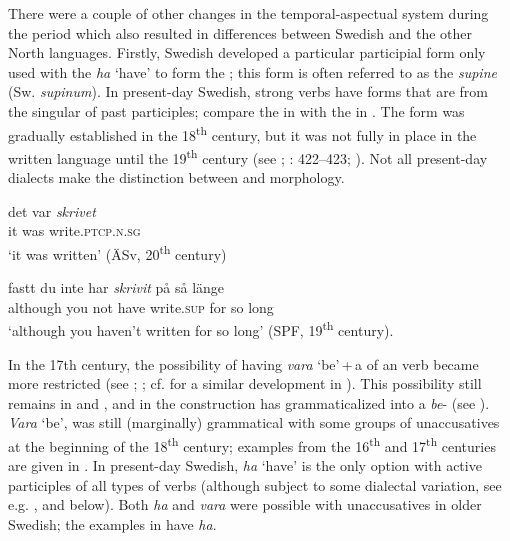 \documentclass[output=paper]{langscibook}
\begin{document}
There were a couple of other changes in the temporal-aspectual system during the  period which also resulted in differences between Swedish and the other North  languages. Firstly, Swedish developed a particular participial form only used with the  \textit{ha} ‘have’ to form the  ; this form is often referred to as the \textit{supine} (Sw. \textit{supinum}). In present-day Swedish, strong verbs have  forms that are  from the  singular of past participles; compare the  in  with the  in . The  form was gradually established in the 18\textsuperscript{th} century, but it was not fully in place in the written language until the 19\textsuperscript{th} century (see \citealt{Platzack1981}; \citealt{Larsson2009}: 422–423; \citealt{Backstrom2019}). Not all present-day dialects make the distinction between  and  morphology.


\ea\label{ex:intro:7}
\ea\label{ex:intro:7a}
\gll  det    var \textit{skrivet} \\
it   was write.\textsc{ptcp.n.sg}\\
\glt    ‘it was written’ (ÄSv, 20\textsuperscript{th} century)


\ex\label{ex:intro:7b}
\gll  fastt       du   inte   har \textit{skrivit}  på   så   länge\\
      although   you   not   have   write.\textsc{sup}   for   so long\\
\glt    ‘although you haven’t written for so long’ (SPF, 19\textsuperscript{th} century).
\z
\z


In the 17th century, the possibility of having \textit{vara} ‘be’\,+\,a  of an  verb became more restricted (see \citealt{Johannisson1945}; \citealt{Larsson2009,Larsson2015}; cf. \citealt{McFaddenAlexiadou2005} for a similar development in ). This possibility still remains in  and , and in  the construction has grammaticalized into a \textit{be}{}- (see \citealt{Larsson2021Emergence}). \textit{Vara} ‘be’, was still (marginally) grammatical with some groups of unaccusatives at the beginning of the 18\textsuperscript{th} century; examples from the 16\textsuperscript{th} and 17\textsuperscript{th} centuries are given in . In present-day Swedish, \textit{ha} ‘have’ is the only option with active participles of all types of verbs (although subject to some dialectal variation, see e.g. \citealt{Larsson2014HAVE}, and  below). Both \textit{ha} and \textit{vara} were possible with unaccusatives in older Swedish; the examples in  have \textit{ha}.
\end{document}
